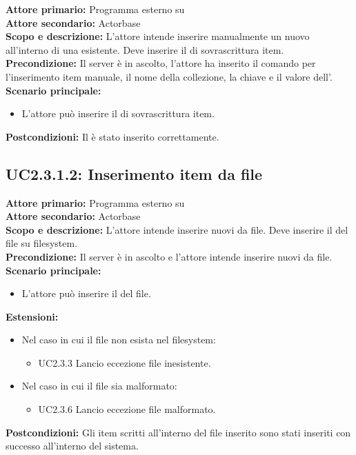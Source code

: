 \documentclass{scalatekids-article}
\begin{document}
\textbf{Attore primario:} Programma esterno su \\
\textbf{Attore secondario:} Actorbase\\
\textbf{Scopo e descrizione:} L'attore intende inserire manualmente un nuovo  all'interno di una  esistente. Deve inserire il  di sovrascrittura item.\\
\textbf{Precondizione:} Il server è in ascolto, l'attore ha inserito il comando per l'inserimento item manuale, il nome della collezione, la chiave e il valore dell'.\\
\textbf{Scenario principale:}
\begin{itemize}
\item L'attore può inserire il  di sovrascrittura item.
\end{itemize}
\textbf{Postcondizioni:} Il  è stato inserito correttamente.

\subsection{UC2.3.1.2: Inserimento item da file}

\textbf{Attore primario:} Programma esterno su \\
\textbf{Attore secondario:} Actorbase\\
\textbf{Scopo e descrizione:} L'attore intende inserire nuovi  da file. Deve inserire il  del file su filesystem.\\
\textbf{Precondizione:} Il server è in ascolto e l'attore intende inserire nuovi  da file.\\
\textbf{Scenario principale:}
\begin{itemize}
\item L'attore può inserire il  del file.
\end{itemize}
\textbf{Estensioni:}
\begin{itemize}
\item Nel caso in cui il file non esista nel filesystem:
  \begin{itemize}
  \item UC2.3.3 Lancio eccezione file inesistente.
  \end{itemize}
\item Nel caso in cui il file sia malformato:
  \begin{itemize}
  \item UC2.3.6 Lancio eccezione file malformato.
  \end{itemize}
\end{itemize}
\textbf{Postcondizioni:} Gli item scritti all'interno del file inserito sono stati inseriti con successo all'interno del sistema.%
\end{document}
